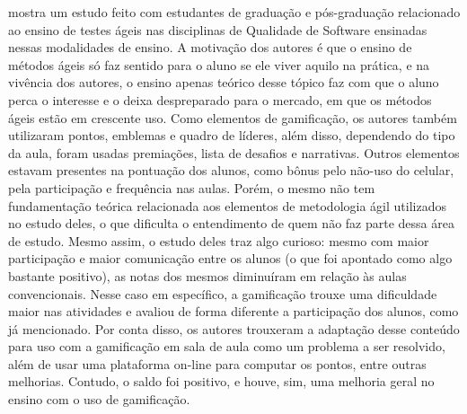 \documentclass[twoside,english,brazilian]{UNISINOSartigo}
\begin{document}
\cite{Elgrably} mostra um estudo feito com estudantes de graduação e pós-graduação relacionado ao ensino de testes ágeis nas disciplinas de Qualidade de Software ensinadas nessas modalidades de ensino. A motivação dos autores é que o ensino de métodos ágeis só faz sentido para o aluno se ele viver aquilo na prática, e na vivência dos autores, o ensino apenas teórico desse tópico faz com que o aluno perca o interesse e o deixa despreparado para o mercado, em que os métodos ágeis estão em crescente uso. Como elementos de gamificação, os autores também utilizaram pontos, emblemas e quadro de líderes, além disso, dependendo do tipo da aula, foram usadas premiações, lista de desafios e narrativas. Outros elementos estavam presentes na pontuação dos alunos, como bônus pelo não-uso do celular, pela participação e frequência nas aulas. Porém, o mesmo não tem fundamentação teórica relacionada aos elementos de metodologia ágil utilizados no estudo deles, o que dificulta o entendimento de quem não faz parte dessa área de estudo. Mesmo assim, o estudo deles traz algo curioso: mesmo com maior participação e maior comunicação entre os alunos (o que foi apontado como algo bastante positivo), as notas dos mesmos diminuíram em relação às aulas convencionais. Nesse caso em específico, a gamificação trouxe uma dificuldade maior nas atividades e avaliou de forma diferente a participação dos alunos, como já mencionado. Por conta disso, os autores trouxeram a adaptação desse conteúdo para uso com a gamificação em sala de aula como um problema a ser resolvido, além de usar uma plataforma on-line para computar os pontos, entre outras melhorias. Contudo, o saldo foi positivo, e houve, sim, uma melhoria geral no ensino com o uso de gamificação.

\end{document}
